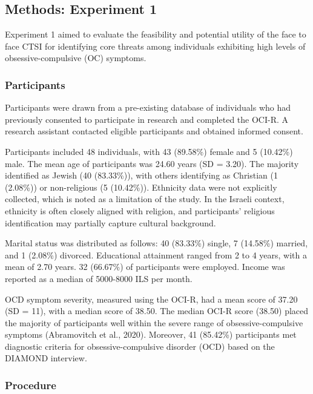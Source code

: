 \documentclass[
  man,floatsintext]{apa7}
\begin{document}
\subsection{Methods: Experiment 1}\label{methods-experiment-1}

Experiment 1 aimed to evaluate the feasibility and potential utility of the face to face CTSI for identifying core threats among individuals exhibiting high levels of obsessive-compulsive (OC) symptoms.

\subsubsection{Participants}\label{participants}

Participants were drawn from a pre-existing database of individuals who had previously consented to participate in research and completed the OCI-R.
A research assistant contacted eligible participants and obtained informed consent.

Participants included 48 individuals, with 43 (89.58\%) female and 5 (10.42\%) male.
The mean age of participants was 24.60 years (SD = 3.20).
The majority identified as Jewish (40 (83.33\%)), with others identifying as Christian (1 (2.08\%)) or non-religious (5 (10.42\%)).
Ethnicity data were not explicitly collected, which is noted as a limitation of the study.
In the Israeli context, ethnicity is often closely aligned with religion, and participants' religious identification may partially capture cultural background.

Marital status was distributed as follows: 40 (83.33\%) single, 7 (14.58\%) married, and 1 (2.08\%) divorced.
Educational attainment ranged from 2 to 4 years, with a mean of 2.70 years.
32 (66.67\%) of participants were employed.
Income was reported as a median of 5000-8000 ILS per month.

OCD symptom severity, measured using the OCI-R, had a mean score of 37.20 (SD = 11), with a median score of 38.50.
The median OCI-R score (38.50) placed the majority of participants well within the severe range of obsessive-compulsive symptoms (Abramovitch et al., 2020).
Moreover, 41 (85.42\%) participants met diagnostic criteria for obsessive-compulsive disorder (OCD) based on the DIAMOND interview.

\subsubsection{Procedure}\label{procedure}
\end{document}
